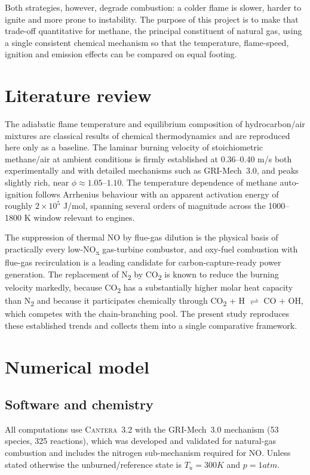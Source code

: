 \documentclass[11pt,a4paper]{article}
\begin{document}
Both strategies, however, degrade combustion: a colder flame is slower, harder
to ignite and more prone to instability. The purpose of this project is to make
that trade-off quantitative for methane, the principal constituent of natural
gas, using a single consistent chemical mechanism so that the temperature,
flame-speed, ignition and emission effects can be compared on equal footing.

\section{Literature review}
The adiabatic flame temperature and equilibrium composition of hydrocarbon/air
mixtures are classical results of chemical thermodynamics and are reproduced
here only as a baseline. The laminar burning velocity of stoichiometric
methane/air at ambient conditions is firmly established at
0.36--0.40 m/s both experimentally and with detailed
mechanisms such as GRI-Mech~3.0, and peaks slightly rich, near
$\phi \approx 1.05$--$1.10$. The temperature dependence of methane
auto-ignition follows Arrhenius behaviour with an apparent activation energy of
roughly $2\times10^{5}$ J/mol, spanning several orders of magnitude across
the 1000--1800 K window relevant to engines.

The suppression of thermal NO by flue-gas dilution is the physical basis of
practically every low-NO\textsubscript{x} gas-turbine combustor, and oxy-fuel
combustion with flue-gas recirculation is a leading candidate for
carbon-capture-ready power generation. The replacement of N\textsubscript{2} by
CO\textsubscript{2} is known to reduce the burning velocity markedly, because
CO\textsubscript{2} has a substantially higher molar heat capacity than
N\textsubscript{2} and because it participates chemically through
CO\textsubscript{2} + H $\rightleftharpoons$ CO + OH, which competes with the
chain-branching pool. The present study reproduces these established trends and
collects them into a single comparative framework.

\section{Numerical model}
\subsection{Software and chemistry}
All computations use \textsc{Cantera}~3.2 with the GRI-Mech~3.0 mechanism
(53 species, 325 reactions), which was developed and validated for natural-gas
combustion and includes the nitrogen sub-mechanism required for NO. Unless
stated otherwise the unburned/reference state is
$T_u = 300 K$ and $p = 1 atm$.
\end{document}
